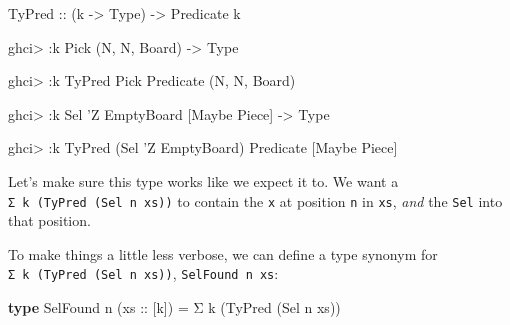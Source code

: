 \documentclass[]{article}
\newenvironment{Shaded}{}{}
\newcommand{\DataTypeTok}[1]{\textcolor[rgb]{0.56,0.13,0.00}{#1}}
\newcommand{\FunctionTok}[1]{\textcolor[rgb]{0.02,0.16,0.49}{#1}}
\newcommand{\KeywordTok}[1]{\textcolor[rgb]{0.00,0.44,0.13}{\textbf{#1}}}
\newcommand{\NormalTok}[1]{#1}
\newcommand{\OtherTok}[1]{\textcolor[rgb]{0.00,0.44,0.13}{#1}}
\begin{document}
\begin{Shaded}
\begin{Highlighting}[]
\DataTypeTok{TyPred}\OtherTok{ ::}\NormalTok{ (k }\OtherTok{->} \DataTypeTok{Type}\NormalTok{) }\OtherTok{->} \DataTypeTok{Predicate}\NormalTok{ k}
\end{Highlighting}
\end{Shaded}

\begin{Shaded}
\begin{Highlighting}[]
\NormalTok{ghci}\FunctionTok{>} \FunctionTok{:}\NormalTok{k }\DataTypeTok{Pick}
\NormalTok{(}\DataTypeTok{N}\NormalTok{, }\DataTypeTok{N}\NormalTok{, }\DataTypeTok{Board}\NormalTok{) }\OtherTok{->} \DataTypeTok{Type}

\NormalTok{ghci}\FunctionTok{>} \FunctionTok{:}\NormalTok{k }\DataTypeTok{TyPred} \DataTypeTok{Pick}
\DataTypeTok{Predicate}\NormalTok{ (}\DataTypeTok{N}\NormalTok{, }\DataTypeTok{N}\NormalTok{, }\DataTypeTok{Board}\NormalTok{)}

\NormalTok{ghci}\FunctionTok{>} \FunctionTok{:}\NormalTok{k }\DataTypeTok{Sel}\NormalTok{ '}\DataTypeTok{Z} \DataTypeTok{EmptyBoard}
\NormalTok{[}\DataTypeTok{Maybe} \DataTypeTok{Piece}\NormalTok{] }\OtherTok{->} \DataTypeTok{Type}

\NormalTok{ghci}\FunctionTok{>} \FunctionTok{:}\NormalTok{k }\DataTypeTok{TyPred}\NormalTok{ (}\DataTypeTok{Sel}\NormalTok{ '}\DataTypeTok{Z} \DataTypeTok{EmptyBoard}\NormalTok{)}
\DataTypeTok{Predicate}\NormalTok{ [}\DataTypeTok{Maybe} \DataTypeTok{Piece}\NormalTok{]}
\end{Highlighting}
\end{Shaded}

Let's make sure this type works like we expect it to. We want a
\texttt{Σ\ k\ (TyPred\ (Sel\ n\ xs))} to contain the \texttt{x} at position
\texttt{n} in \texttt{xs}, \emph{and} the \texttt{Sel} into that position.

To make things a little less verbose, we can define a type synonym for
\texttt{Σ\ k\ (TyPred\ (Sel\ n\ xs))}, \texttt{SelFound\ n\ xs}:

\begin{Shaded}
\begin{Highlighting}[]
\KeywordTok{type} \DataTypeTok{SelFound}\NormalTok{ n (}\OtherTok{xs ::}\NormalTok{ [k]) }\FunctionTok{=}\NormalTok{ Σ k (}\DataTypeTok{TyPred}\NormalTok{ (}\DataTypeTok{Sel}\NormalTok{ n xs))}
\end{Highlighting}
\end{Shaded}
\end{document}
